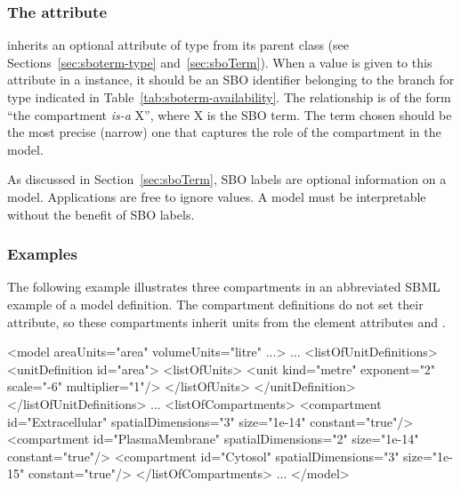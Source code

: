 \subsubsection{The  attribute}
\label{sec:compartment-sboterm}

\Compartment inherits an optional 
attribute of type  from its parent
class \SBase (see Sections~\ref{sec:sboterm-type}
and~\ref{sec:sboTerm}).  When a value is given to this
attribute in a \Compartment instance, it should be an
SBO identifier belonging to the branch for type \Compartment 
indicated in Table~\ref{tab:sboterm-availability}.  The relationship is
of the form ``the compartment  \emph{is-a} X'', where X is
the SBO term.  The term chosen should be the most precise (narrow)
one that captures the role of the compartment in the model.

As discussed in Section~\ref{sec:sboTerm}, SBO labels are optional
information on a model.  Applications are free to ignore
 values.  A model must be interpretable without the
benefit of SBO labels.


\subsubsection{Examples}

The following example illustrates three compartments in an
abbreviated SBML example of a model definition.  The compartment
definitions do not set their  attribute, so 
these compartments inherit units from the  element
attributes  and .

\begin{example}
<model areaUnits="area" volumeUnits="litre" ...>
    ...
    <listOfUnitDefinitions>
        <unitDefinition id="area">
            <listOfUnits>
                <unit kind="metre" exponent="2" scale="-6" multiplier="1"/>
            </listOfUnits>
        </unitDefinition>
    </listOfUnitDefinitions>
    ...
    <listOfCompartments>
        <compartment id="Extracellular"  spatialDimensions="3" size="1e-14" constant="true"/>
        <compartment id="PlasmaMembrane" spatialDimensions="2" size="1e-14" constant="true"/>
        <compartment id="Cytosol"        spatialDimensions="3" size="1e-15" constant="true"/>
    </listOfCompartments>
    ...
</model>
\end{example}


